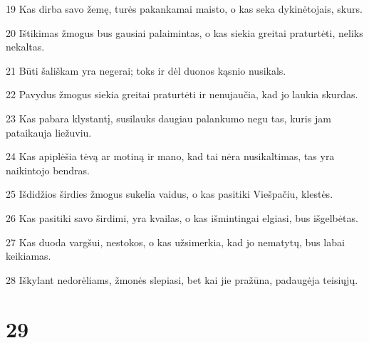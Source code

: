 \par 19 Kas dirba savo žemę, turės pakankamai maisto, o kas seka dykinėtojais, skurs. 
\par 20 Ištikimas žmogus bus gausiai palaimintas, o kas siekia greitai praturtėti, neliks nekaltas. 
\par 21 Būti šališkam yra negerai; toks ir dėl duonos kąsnio nusikals. 
\par 22 Pavydus žmogus siekia greitai praturtėti ir nenujaučia, kad jo laukia skurdas. 
\par 23 Kas pabara klystantį, susilauks daugiau palankumo negu tas, kuris jam pataikauja liežuviu. 
\par 24 Kas apiplėšia tėvą ar motiną ir mano, kad tai nėra nusikaltimas, tas yra naikintojo bendras. 
\par 25 Išdidžios širdies žmogus sukelia vaidus, o kas pasitiki Viešpačiu, klestės. 
\par 26 Kas pasitiki savo širdimi, yra kvailas, o kas išmintingai elgiasi, bus išgelbėtas. 
\par 27 Kas duoda vargšui, nestokos, o kas užsimerkia, kad jo nematytų, bus labai keikiamas. 
\par 28 Iškylant nedorėliams, žmonės slepiasi, bet kai jie pražūna, padaugėja teisiųjų.



\chapter{29}


